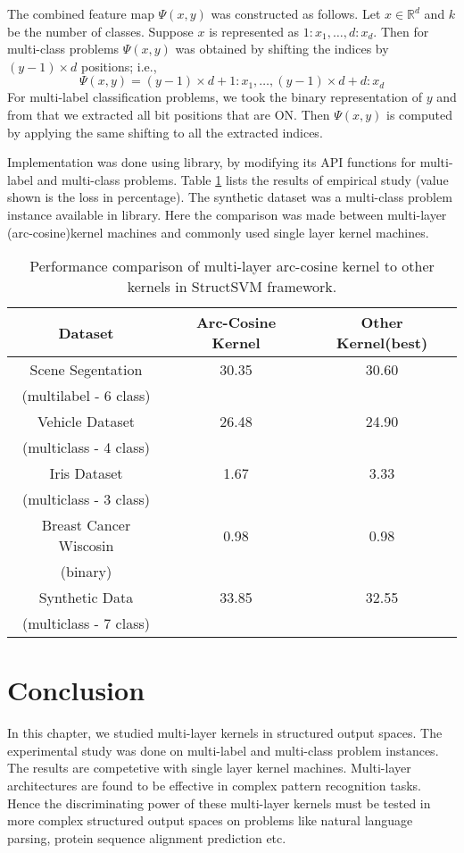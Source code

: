 The combined feature map $\Psi(x,y)$ was constructed as follows. Let $x \in \mathbb{R}^d$ and $k$ be the number of classes. Suppose $x$ is represented as $1:x_1, \ldots, d:x_d$. Then for multi-class problems $\Psi(x,y)$ was obtained by shifting the indices by $(y-1) \times d$ positions; i.e.,
\[ \Psi(x,y) = (y-1) \times d+1:x_1, \ldots, (y-1) \times d+d:x_d \]
For multi-label classification problems, we took the binary representation of $y$ and from that we extracted all bit positions that are ON. Then $\Psi(x,y)$ is computed by applying the same shifting to all the extracted indices.

Implementation was done using \cite{svm_struct} library, by modifying its API functions for multi-label and multi-class problems. Table \ref{chap5_tab1} lists the results of empirical study (value shown is the loss in percentage). The synthetic dataset was a multi-class problem instance available in \cite{svm_struct} library. Here the comparison was made between multi-layer (arc-cosine)kernel machines and commonly used single layer kernel machines.

\renewcommand{\arraystretch}{1.2}
\begin{table}
\centering
\begin{tabular}{|c|c|c|}
	\hline
	\textbf{Dataset} & \textbf{Arc-Cosine Kernel} & \textbf{Other Kernel(best)}\\
	\hline
	Scene Segentation & 30.35 & 30.60 \\
	(multilabel - 6 class) & & \\
	\hline
	Vehicle Dataset & 26.48 & 24.90 \\
	(multiclass - 4 class) & & \\
	\hline
	Iris Dataset & 1.67 & 3.33 \\
	(multiclass - 3 class) & & \\
	\hline
	Breast Cancer Wiscosin & 0.98 & 0.98 \\
	(binary) & & \\
	\hline
	Synthetic Data & 33.85 & 32.55 \\
	(multiclass - 7 class) & & \\
	\hline
\end{tabular}
\caption{Performance comparison of multi-layer arc-cosine kernel to other kernels in StructSVM framework.}
\label{chap5_tab1}
\end{table}
\renewcommand{\arraystretch}{1}

\section{Conclusion}
\label{chap5_conc}
In this chapter, we studied multi-layer kernels in structured output spaces. The experimental study was done on multi-label and multi-class problem instances. The results are competetive with single layer kernel machines. Multi-layer architectures are found to be effective in complex pattern recognition tasks. Hence the discriminating power of these multi-layer kernels must be tested in more complex structured output spaces on problems like natural language parsing, protein sequence alignment prediction etc.  
